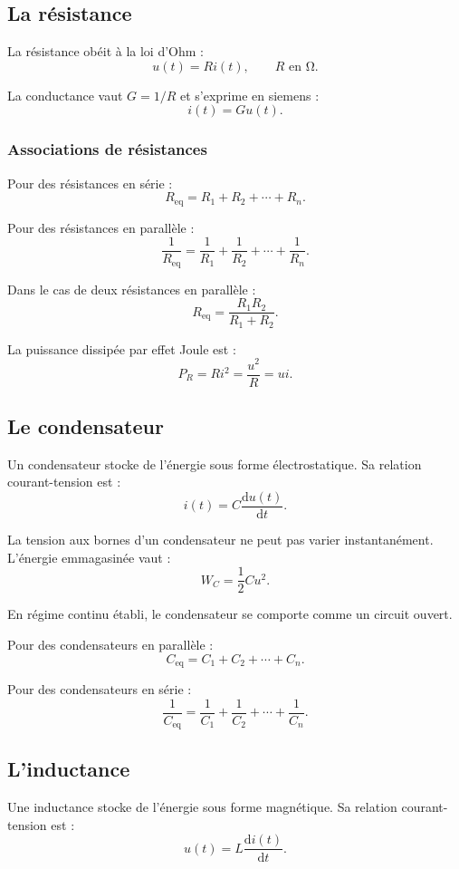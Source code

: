\subsection{La résistance}

La résistance obéit à la loi d'Ohm :
\[
u(t)=Ri(t),
\qquad
R\text{ en }\si{\ohm}.
\]

La conductance vaut $G=1/R$ et s'exprime en siemens :
\[
i(t)=Gu(t).
\]

\subsubsection{Associations de résistances}

Pour des résistances en série :
\[
R_{\mathrm{eq}}=R_1+R_2+\cdots+R_n.
\]

Pour des résistances en parallèle :
\[
\frac{1}{R_{\mathrm{eq}}}=\frac{1}{R_1}+\frac{1}{R_2}+\cdots+\frac{1}{R_n}.
\]

Dans le cas de deux résistances en parallèle :
\[
R_{\mathrm{eq}}=\frac{R_1R_2}{R_1+R_2}.
\]

La puissance dissipée par effet Joule est :
\[
P_R=Ri^2=\frac{u^2}{R}=ui.
\]

\subsection{Le condensateur}

Un condensateur stocke de l'énergie sous forme électrostatique. Sa relation courant-tension est :
\[
i(t)=C\frac{\mathrm{d}u(t)}{\mathrm{d}t}.
\]

La tension aux bornes d'un condensateur ne peut pas varier instantanément. L'énergie emmagasinée vaut :
\[
W_C=\frac{1}{2}Cu^2.
\]

En régime continu établi, le condensateur se comporte comme un circuit ouvert.

Pour des condensateurs en parallèle :
\[
C_{\mathrm{eq}}=C_1+C_2+\cdots+C_n.
\]

Pour des condensateurs en série :
\[
\frac{1}{C_{\mathrm{eq}}}=\frac{1}{C_1}+\frac{1}{C_2}+\cdots+\frac{1}{C_n}.
\]

\subsection{L'inductance}

Une inductance stocke de l'énergie sous forme magnétique. Sa relation courant-tension est :
\[
u(t)=L\frac{\mathrm{d}i(t)}{\mathrm{d}t}.
\]

